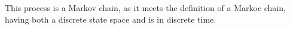 This process is a Markov chain, as it meets the definition of a Markoc chain,
having both a discrete state space and is in discrete time.
